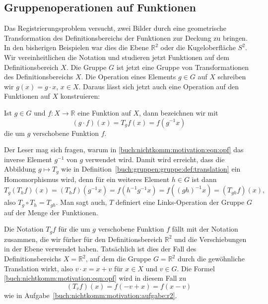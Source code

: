 \subsection{Gruppenoperationen auf Funktionen
\label{buch:nichtkomm:motivation:subsection:gruppenoperationen}}
Das Registrierungsproblem versucht, zwei Bilder durch eine geometrische
Transformation des Definitionsbereichs der Funktionen zur Deckung
zu bringen.
In den bisherigen Beispielen war dies die Ebene $\mathbb{R}^2$ oder
die Kugeloberfläche $S^2$.
Wir vereinheitlichen die Notation und studieren jetzt Funktionen
auf dem Definitionsbereich $X$.
Die Gruppe $G$ ist jetzt eine Gruppe von Transformationen des
Definitionsbereichs $X$.
Die Operation eines Elements $g\in G$ auf $X$ schreiben wir
$g(x) = g\cdot x$, $x\in X$.
Daraus lässt sich jetzt auch eine Operation auf den Funktionen auf
$X$ konstruieren:

\begin{definition}[Translation]
Ist $g\in G$ und $f\colon X\to\mathbb{R}$ eine Funktion auf $X$, dann
bezeichnen wir mit
\begin{equation}
(g\cdot f)(x)
=
T_gf(x)
=
f(g^{-1}x)
\label{buch:nichtkomm:motivation:eqn:opf}
\end{equation}
die um $g$ verschobene Funktion $f$.
\end{definition}

Der Leser mag sich fragen, warum in
\eqref{buch:nichtkomm:motivation:eqn:opf}
das inverse Element $g^{-1}$ von $g$ verwendet wird.
Damit wird erreicht, dass die Abbildung $g\mapsto T_g$
wie in Definition~\ref{buch:gruppen:gruppe:def:translation}
ein Homomorphismus wird, denn für ein weiteres Element $h\in G$
ist dann
\[
T_g(T_hf)(x)
=
(T_hf)(g^{-1}x)
=
f(h^{-1}g^{-1}x)
=
f((gh)^{-1}x)
=
(T_{gh}f)(x),
\]
also $T_g\circ T_h= T_{gh}$.
Man sagt auch, $T$ definiert eine Links-Operation der Gruppe $G$ 
auf der Menge der Funktionen.

Die Notation $T_gf$ für die um $g$ verschobene Funktion $f$ fällt
mit der Notation zusammen, die wir fürher für den Definitionsbereich
$\mathbb{R}^2$ und die Verschiebungen in der Ebene verwendet haben.
Tatsächlich ist dies der Fall des Definitionsbereichs $X=\mathbb{R}^2$,
auf dem die Gruppe $G=\mathbb{R}^2$ durch die gewöhnliche
Translation wirkt, also $v\cdot x = x +v$ für $x\in X$ und $v\in G$.
Die Formel \eqref{buch:nichtkomm:motivation:eqn:opf} wird in diesem
Fall zu
\[
(T_vf)(x) = f(-v + x) = f(x-v)
\]
wie in Aufgabe~\ref{buch:nichtkomm:motivation:aufgabe:r2}.

%
%
